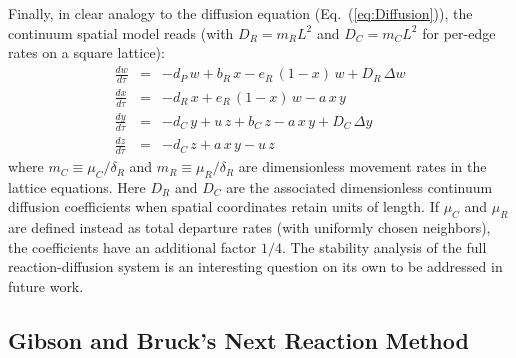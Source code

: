 Finally, in clear analogy to the diffusion equation (Eq.~(\ref{eq:Diffusion})), the continuum spatial model reads (with $D_R=m_RL^2$ and $D_C=m_CL^2$ for per-edge rates on a square lattice): 
\begin{eqnarray}
\label{eq:wws}
\frac{dw}{d\tau}   & = & -d_P \,w + b_R\,x - e_R\,(1-x)\,w + D_R \, \Delta w\\
\label{eq:xxs}
\frac{dx}{d\tau}   & = & -d_R \,x + e_R\,(1-x)\,w -a\,x\,y \\
\label{eq:yys}
\frac{dy}{d\tau}   & = & -d_C \,y + u\,z + b_C\,z -a\,x\,y + D_C \, \Delta y\\
\label{eq:zzs}
\frac{dz}{d\tau}   & = & -d_C \,z + a\,x\,y -u\,z 
\end{eqnarray}
where $m_C \equiv \mu_C/\delta_R$ and $m_R \equiv \mu_R/\delta_R$ are dimensionless movement rates in the lattice equations. Here $D_R$ and $D_C$ are the associated dimensionless continuum diffusion coefficients when spatial coordinates retain units of length. If $\mu_C$ and $\mu_R$ are defined instead as total departure rates (with uniformly chosen neighbors), the coefficients have an additional factor $1/4$. The stability analysis of the full reaction-diffusion system is an interesting question on its own to be addressed in future work.  

\subsection{Gibson and Bruck's Next Reaction Method}
